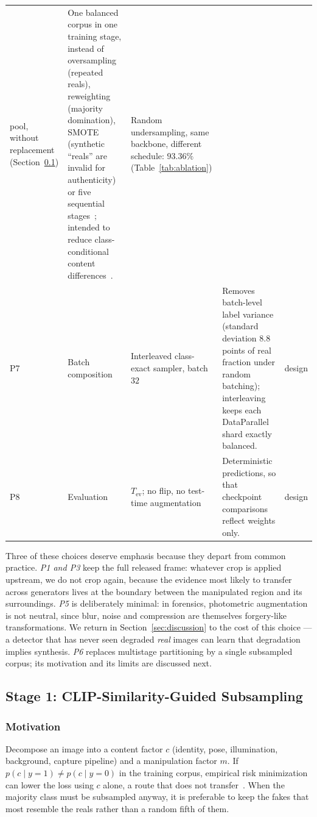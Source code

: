 \documentclass[10pt,journal]{IEEEtran}
\begin{document}
\begin{table}[!t]
\begin{tabular}{@{}lL{2.55cm}L{3.1cm}L{6.9cm}L{3.3cm}@{}}
pool, without replacement (Section~\ref{sec:pairing}) &
One balanced corpus in one training stage, instead of oversampling (repeated
reals), reweighting (majority domination), SMOTE (synthetic ``reals'' are
invalid for authenticity) or five sequential stages~\cite{bhattacharjee2026caenet};
intended to reduce class-conditional content differences~\cite{dong2023identityleakage}. &
Random undersampling, same backbone, different schedule: $93.36\%$
(Table~\ref{tab:ablation}) \\
P7 & Batch composition & Interleaved class-exact sampler, batch $32$ &
Removes batch-level label variance (standard deviation $8.8$ points of real
fraction under random batching); interleaving keeps each DataParallel shard
exactly balanced. & design \\
P8 & Evaluation & $T_{\mathrm{ev}}$; no flip, no test-time augmentation &
Deterministic predictions, so that checkpoint comparisons reflect weights
only. & design \\
\bottomrule
\end{tabular}
\end{table}

Three of these choices deserve emphasis because they depart from common
practice. \emph{P1 and P3} keep the full released frame: whatever crop is
applied upstream, we do not crop again, because the evidence most likely to
transfer across generators lives at the boundary between the manipulated
region and its surroundings. \emph{P5} is deliberately minimal: in forensics,
photometric augmentation is not neutral, since blur, noise and compression are
themselves forgery-like transformations. We return in
Section~\ref{sec:discussion} to the cost of this choice --- a detector that has
never seen degraded \emph{real} images can learn that degradation implies
synthesis. \emph{P6} replaces multistage partitioning by a single subsampled
corpus; its motivation and its limits are discussed next.

\subsection{Stage 1: CLIP-Similarity-Guided Subsampling}\label{sec:pairing}
\subsubsection{Motivation}
Decompose an image into a content factor $c$ (identity, pose, illumination,
background, capture pipeline) and a manipulation factor $m$. If
$p(c\mid y{=}1)\neq p(c\mid y{=}0)$ in the training corpus, empirical risk
minimization can lower the loss using $c$ alone, a route that does not
transfer~\cite{dong2023identityleakage}. When the majority class must be
subsampled anyway, it is preferable to keep the fakes that most resemble the
reals rather than a random fifth of them.
\end{document}
